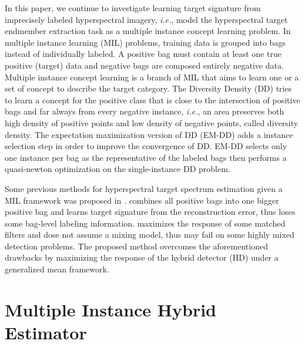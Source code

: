 \documentclass{article}
\def\ie{\emph{i.e.}}
\begin{document}
	In this paper, we continue to investigate learning target signature from imprecisely labeled hyperspectral imagery, \ie, model the hyperspectral target endmember extraction task as a multiple instance concept learning problem. In multiple instance learning (MIL)  \cite{Dietterich:1997} problems, training data is grouped into bags instead of individually labeled. A positive bag must contain at least one true positive (target) data and negative bags are composed entirely negative data. Multiple instance concept learning is a branch of MIL that aims to learn one or a set of concept to describe the target category. The Diversity Density (DD) \cite{Maron:1998} tries to learn a concept for the positive class that is close to the intersection of positive bags and far always from every negative instance, \ie, an area preserves both high density of positive points and low density of negative points, called diversity density. The expectation maximization version of DD (EM-DD) \cite{Zhang:2002} adds a instance selection step in order to improve the convergence of DD. EM-DD selects only one instance per bag as the representative of the labeled bags then performs a quasi-newton optimization on the single-instance DD problem. 
	
	Some previous methods for hyperspectral target spectrum estimation given a MIL framework was proposed in \cite{Zare:2015fumi, zare2016miace}. \cite{Zare:2015fumi} combines all positive bags into one bigger positive bag and learns target signature from the reconstruction error, thus loses some bag-level labeling information. \cite{zare2016miace} maximizes the response of some matched filters and dose not assume a mixing model, thus may fail on some highly mixed detection problems. The proposed method overcomes the aforementioned drawbacks by maximizing the response of the hybrid detector (HD) \cite{Broadwater:2007} under a generalized mean framework.
	

	\section{Multiple Instance Hybrid Estimator}
	\label{sec:MIHE}
	
\end{document}
